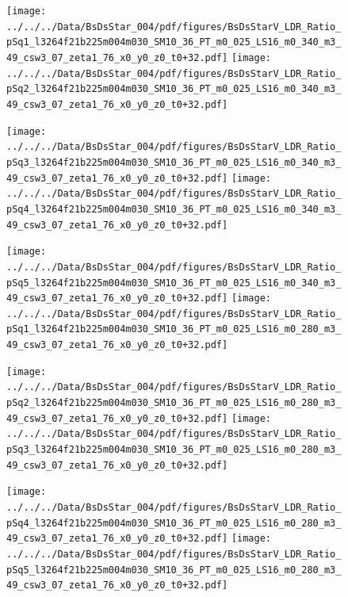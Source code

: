 \documentclass[a4paper,10pt]{article}
\begin{document}
\begin{figure}[p]
 \texttt{[image: ../../../Data/BsDsStar\_004/pdf/figures/BsDsStarV\_LDR\_Ratio\_pSq1\_l3264f21b225m004m030\_SM10\_36\_PT\_m0\_025\_LS16\_m0\_340\_m3\_49\_csw3\_07\_zeta1\_76\_x0\_y0\_z0\_t0+32.pdf]} 
 \texttt{[image: ../../../Data/BsDsStar\_004/pdf/figures/BsDsStarV\_LDR\_Ratio\_pSq2\_l3264f21b225m004m030\_SM10\_36\_PT\_m0\_025\_LS16\_m0\_340\_m3\_49\_csw3\_07\_zeta1\_76\_x0\_y0\_z0\_t0+32.pdf]} 
 \end{figure}
\begin{figure}[p]
 \texttt{[image: ../../../Data/BsDsStar\_004/pdf/figures/BsDsStarV\_LDR\_Ratio\_pSq3\_l3264f21b225m004m030\_SM10\_36\_PT\_m0\_025\_LS16\_m0\_340\_m3\_49\_csw3\_07\_zeta1\_76\_x0\_y0\_z0\_t0+32.pdf]} 
 \texttt{[image: ../../../Data/BsDsStar\_004/pdf/figures/BsDsStarV\_LDR\_Ratio\_pSq4\_l3264f21b225m004m030\_SM10\_36\_PT\_m0\_025\_LS16\_m0\_340\_m3\_49\_csw3\_07\_zeta1\_76\_x0\_y0\_z0\_t0+32.pdf]} 
 \end{figure}
\begin{figure}[p]
 \texttt{[image: ../../../Data/BsDsStar\_004/pdf/figures/BsDsStarV\_LDR\_Ratio\_pSq5\_l3264f21b225m004m030\_SM10\_36\_PT\_m0\_025\_LS16\_m0\_340\_m3\_49\_csw3\_07\_zeta1\_76\_x0\_y0\_z0\_t0+32.pdf]} 
 \texttt{[image: ../../../Data/BsDsStar\_004/pdf/figures/BsDsStarV\_LDR\_Ratio\_pSq1\_l3264f21b225m004m030\_SM10\_36\_PT\_m0\_025\_LS16\_m0\_280\_m3\_49\_csw3\_07\_zeta1\_76\_x0\_y0\_z0\_t0+32.pdf]} 
 \end{figure}
\clearpage
\begin{figure}[p]
 \texttt{[image: ../../../Data/BsDsStar\_004/pdf/figures/BsDsStarV\_LDR\_Ratio\_pSq2\_l3264f21b225m004m030\_SM10\_36\_PT\_m0\_025\_LS16\_m0\_280\_m3\_49\_csw3\_07\_zeta1\_76\_x0\_y0\_z0\_t0+32.pdf]} 
 \texttt{[image: ../../../Data/BsDsStar\_004/pdf/figures/BsDsStarV\_LDR\_Ratio\_pSq3\_l3264f21b225m004m030\_SM10\_36\_PT\_m0\_025\_LS16\_m0\_280\_m3\_49\_csw3\_07\_zeta1\_76\_x0\_y0\_z0\_t0+32.pdf]} 
 \end{figure}
\begin{figure}[p]
 \texttt{[image: ../../../Data/BsDsStar\_004/pdf/figures/BsDsStarV\_LDR\_Ratio\_pSq4\_l3264f21b225m004m030\_SM10\_36\_PT\_m0\_025\_LS16\_m0\_280\_m3\_49\_csw3\_07\_zeta1\_76\_x0\_y0\_z0\_t0+32.pdf]} 
 \texttt{[image: ../../../Data/BsDsStar\_004/pdf/figures/BsDsStarV\_LDR\_Ratio\_pSq5\_l3264f21b225m004m030\_SM10\_36\_PT\_m0\_025\_LS16\_m0\_280\_m3\_49\_csw3\_07\_zeta1\_76\_x0\_y0\_z0\_t0+32.pdf]} 
 \end{figure}
\clearpage
\end{document}
